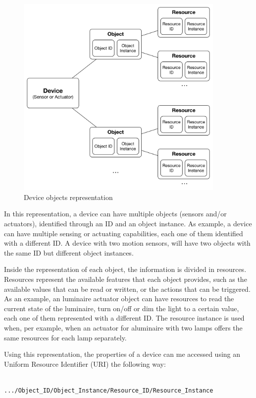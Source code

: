 \begin{figure}[H]
	\centering
	\includegraphics[width=0.9\textwidth]{figures/obj.png}
	\caption{Device objects representation}
	\label{fig:obj}
\end{figure}

In this representation, a device can have multiple objects (sensors and/or actuators), identified through an ID and an object instance. As example, a device can have multiple sensing or actuating capabilities, each one of them identified with a different ID. A device with two motion sensors, will have two objects with the same ID but different object instances. 

Inside the representation of each object, the information is divided in resources. Resources represent the available features that each object provides, such as the available values that can be read or written, or the actions that can be triggered. As an example, an luminaire actuator object can have resources to read the current state of the luminaire, turn  on/off or dim the light to a certain value, each one of them represented with a different ID. The resource instance is used when, per example, when an actuator for aluminaire with two lamps offers the same resources for each lamp separately.

Using this representation, the properties of a device can me accessed using an Uniform Resource Identifier (URI) the following way: 


\begin{verbatim}

.../Object_ID/Object_Instance/Resource_ID/Resource_Instance
	

\end{verbatim}
	
